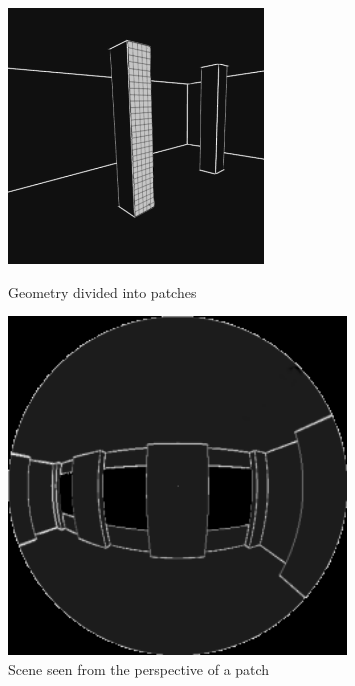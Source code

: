 \begin{figure}[ht]
\begin{minipage}[b]{0.3\linewidth}
\centering
\includegraphics[width=.8\textwidth]{Media/prev_work_radiosity_grid.png}
\caption{Geometry divided into patches}
\label{fig:radiosity_grid}
\end{minipage}
\begin{minipage}[b]{0.3\linewidth}
\centering
\includegraphics[width=0.8\textwidth]{Media/prev_work_radiosity_fisheye.png}
\caption{Scene seen from the perspective of a patch }
\label{fig:radiosity_patch}
\end{minipage}

\end{figure}
